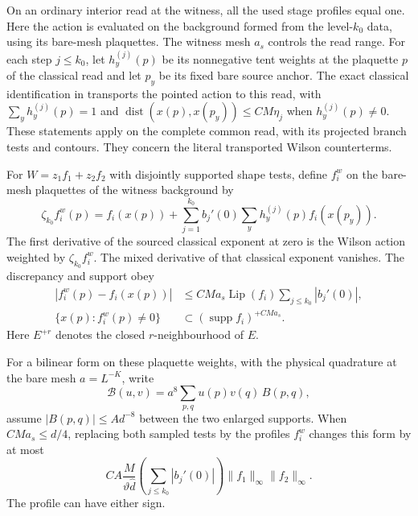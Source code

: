 \documentclass[11pt,letterpaper,reqno]{amsart}
\makeatletter
\numberwithin{equation}{section}
\theoremstyle{definition}
\newcommand{\ms@minorstart}{%
  \pushQED{\qed}\renewcommand{\qedsymbol}{$\blacksquare$}}
\newenvironment{proposition}[1][]{\ms@minorstart\ms@proposition[#1]}
  {\popQED\endms@proposition}
\theoremstyle{remark}
\makeatother
\begin{document}
On an ordinary interior read at the witness, all the used stage
profiles equal one. Here the action is evaluated on the background
formed from the level-\(k_0\) data, using its bare-mesh plaquettes.
The witness mesh \(a_s\) controls the read range. For each step \(j\le k_0\), let \(h_y^{(j)}(p)\)
be its nonnegative tent weights at the plaquette \(p\) of the
classical read and let \(p_y\) be its fixed bare source anchor.
The exact classical identification in \cite{SI} transports the
pointed action to this read, with
\(\sum_y h_y^{(j)}(p)=1\) and
\(\operatorname{dist}(x(p),x(p_y))\le C M\eta_j\)
when \(h_y^{(j)}(p)\ne0\). These statements apply on the complete
common read, with its projected branch tests and contours.
They concern the literal transported Wilson counterterms.

\begin{proposition}[Pointed first derivatives]
\label{fp:prop-pointed-insertion}
For \(W=z_1f_1+z_2f_2\) with disjointly supported shape tests,
define \(f_i^w\) on the bare-mesh plaquettes of the witness background by
\begin{equation}\label{fp:eq-physical-profile}
 \zeta_{k_0} f_i^w(p)=f_i(x(p))+
 \sum_{j=1}^{k_0}b_j'(0)\sum_y h_y^{(j)}(p) f_i(x(p_y)).
\end{equation}
The first derivative of the sourced classical exponent at zero
is the Wilson action weighted by \(\zeta_{k_0}f_i^w\). The mixed
derivative of that classical exponent vanishes. The discrepancy
and support obey
\begin{equation}\label{fp:eq-profile-range}
 \begin{split}
 |f_i^w(p)-f_i(x(p))|
 &\le C M a_s\operatorname{Lip}(f_i)
                 \sum_{j\le k_0}|b_j'(0)|,\\
 \{x(p):f_i^w(p)\ne0\}
 &\subset (\operatorname{supp}f_i)^{+CMa_s}.
 \end{split}
\end{equation}
Here \(E^{+r}\) denotes the closed \(r\)-neighbourhood of \(E\).

For a bilinear form on these plaquette weights, with the physical
quadrature at the bare mesh \(a=L^{-K}\), write
\[
 \mathcal B(u,v)=a^8\sum_{p,q} u(p)v(q)\,B(p,q),
\]
assume \(|B(p,q)|\le A d^{-8}\) between the two enlarged supports.
When \(C M a_s\le d/4\), replacing both sampled tests by the
profiles \(f_i^w\) changes this form by at most
\begin{equation}\label{fp:eq-profile-kernel-error}
 C A\frac{M}{\vartheta\widehat d}
        \left(\sum_{j\le k_0}|b_j'(0)|\right)
        \|f_1\|_\infty\|f_2\|_\infty.
\end{equation}
The profile can have either sign.
\end{proposition}
\end{document}
